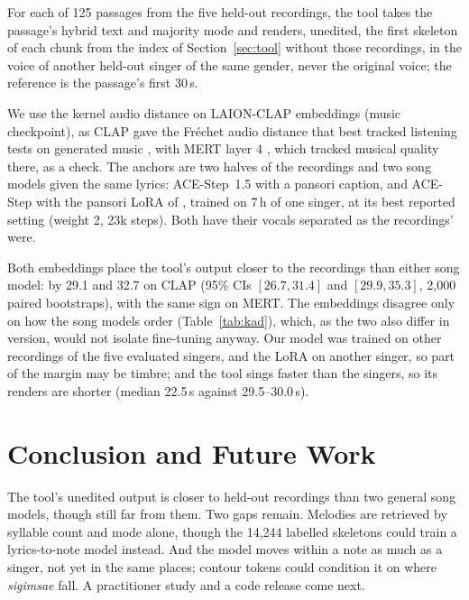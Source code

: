 \documentclass[wcp]{jmlr}
\begin{document}
For each of 125 passages from the five held-out recordings, the tool takes the passage's
hybrid text and majority mode and renders, unedited, the first skeleton of each chunk from
the index of Section~\ref{sec:tool} without those recordings, in the voice of
another held-out singer of the same gender, never the original voice; the
reference is the passage's first 30\,s.

We use the kernel audio distance \citep[KAD;][]{chung2025kad} on LAION-CLAP
\citep{wu2023clap} embeddings (music checkpoint), as CLAP gave the Fr\'echet audio distance
that best tracked listening tests on generated music \citep{gui2024fad},
with MERT layer 4 \citep{li2024mert}, which tracked musical quality there, as a check. The anchors are two halves of the recordings and two song models given the same lyrics: ACE-Step~1.5 \citep{gong2026acestep} with a pansori
caption, and ACE-Step \citep{gong2025acestep} with the pansori LoRA of
\citet{cho2025pansori}, trained on 7\,h of one singer, at its best reported setting
(weight 2, 23k steps). Both have their vocals separated as the recordings' were.

Both embeddings place the tool's output closer to the recordings than either song model:
by 29.1 and 32.7 on CLAP (95\% CIs $[26.7, 31.4]$ and $[29.9, 35.3]$, 2,000 paired
bootstraps), with the same sign on MERT. The embeddings disagree only on how the song
models order (Table~\ref{tab:kad}), which, as the two also differ in version, would not
isolate fine-tuning anyway. Our model was trained on other recordings of the five evaluated singers, and
the LoRA on another singer, so part of the margin may be timbre; and the tool sings faster
than the singers, so its renders are shorter (median 22.5\,s against 29.5--30.0\,s).

\section{Conclusion and Future Work}\label{sec:conclusion}
The tool's unedited output is closer to held-out recordings than two general song
models, though still far from them. Two gaps remain. Melodies are retrieved by syllable count and mode alone,
though the 14,244 labelled skeletons could train a lyrics-to-note model instead. And
the model moves within a note as much as a singer, not yet in the same places; contour
tokens \citep{ju2026contour} could condition it on where \emph{sigimsae} fall. A practitioner
study and a code release come next.
\end{document}
